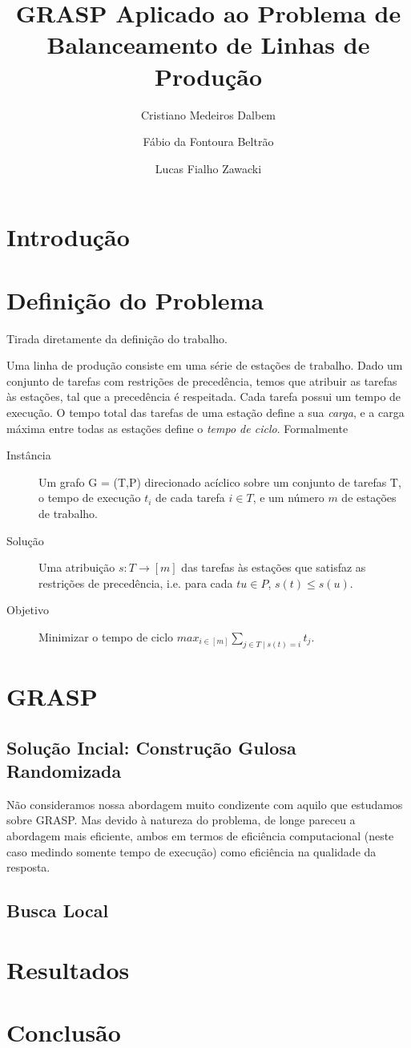 \documentclass{report}
\author{Cristiano Medeiros Dalbem \and Fábio da Fontoura Beltrão \and Lucas Fialho Zawacki}
\title{GRASP Aplicado ao Problema de Balanceamento de Linhas de Produção}
\begin{document}
\maketitle
\tableofcontents

\chapter{Introdução}

\chapter{Definição do Problema}

Tirada diretamente da definição do trabalho.

Uma linha de produção consiste em uma série de estações de trabalho. Dado um conjunto de tarefas com restrições de
precedência, temos que atribuir as tarefas às estações, tal que a precedência é respeitada. Cada tarefa possui um tempo
de execução. O tempo total das tarefas de uma estação define a sua \emph{carga}, e a carga máxima entre todas as
estações define o \emph{tempo de ciclo}. Formalmente

\begin{description}
 \item [Instância] Um grafo G = (T,P) direcionado acíclico sobre um conjunto de tarefas T, o tempo de execução $t_i$ de
cada tarefa $i \in T$, e um número $m$ de estações de trabalho.

 \item [Solução] Uma atribuição $s : T \rightarrow [m]$ das tarefas às estações que satisfaz as restrições de
precedência, i.e. para cada $tu \in P$, $s(t) \leq s(u)$.

 \item [Objetivo] Minimizar o tempo de ciclo  $max_{i\in[m]}\sum_{j\in T\mid s(t)=i}t_j$.
\end{description}




\chapter{GRASP}

\section{Solução Incial: Construção Gulosa Randomizada}

Não consideramos nossa abordagem muito condizente com aquilo que estudamos sobre GRASP. Mas devido à natureza do
problema, de longe pareceu a abordagem mais eficiente, ambos em termos de eficiência computacional (neste caso medindo
somente tempo de execução) como eficiência na qualidade da resposta.

\section{Busca Local}

\chapter{Resultados}

\chapter{Conclusão}
\end{document}
